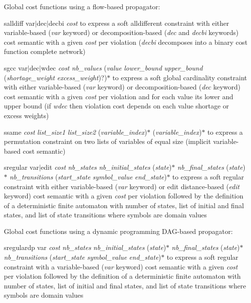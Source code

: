 \documentclass{article}
\begin{document}
\begin{DoxyItemize}
\begin{DoxyItemize}
\end{DoxyItemize}
\item Global cost functions using a flow-\/based propagator\-:
\begin{DoxyItemize}
\item salldiff var$\vert$dec$\vert$decbi {\itshape cost} to express a soft alldifferent constraint with either variable-\/based ({\itshape var} keyword) or decomposition-\/based ({\itshape dec} and {\itshape decbi} keywords) cost semantic with a given {\itshape cost} per violation ({\itshape decbi} decomposes into a binary cost function complete network)
\item sgcc var$\vert$dec$\vert$wdec {\itshape cost} {\itshape nb\-\_\-values} ({\itshape value} {\itshape lower\-\_\-bound} {\itshape upper\-\_\-bound} ({\itshape shortage\-\_\-weight} {\itshape excess\-\_\-weight})?)$\ast$ to express a soft global cardinality constraint with either variable-\/based ({\itshape var} keyword) or decomposition-\/based ({\itshape dec} keyword) cost semantic with a given {\itshape cost} per violation and for each value its lower and upper bound (if {\itshape wdec} then violation cost depends on each value shortage or excess weights)
\item ssame {\itshape cost} {\itshape list\-\_\-size1} {\itshape list\-\_\-size2} ({\itshape variable\-\_\-index})$\ast$ ({\itshape variable\-\_\-index})$\ast$ to express a permutation constraint on two lists of variables of equal size (implicit variable-\/based cost semantic)
\item sregular var$\vert$edit {\itshape cost} {\itshape nb\-\_\-states} {\itshape nb\-\_\-initial\-\_\-states} ({\itshape state})$\ast$ {\itshape nb\-\_\-final\-\_\-states} ({\itshape state})$\ast$ {\itshape nb\-\_\-transitions} ({\itshape start\-\_\-state} {\itshape symbol\-\_\-value} {\itshape end\-\_\-state})$\ast$ to express a soft regular constraint with either variable-\/based ({\itshape var} keyword) or edit distance-\/based ({\itshape edit} keyword) cost semantic with a given {\itshape cost} per violation followed by the definition of a deterministic finite automaton with number of states, list of initial and final states, and list of state transitions where symbols are domain values
\end{DoxyItemize}
\item Global cost functions using a dynamic programming D\-A\-G-\/based propagator\-:
\begin{DoxyItemize}
\item sregulardp var {\itshape cost} {\itshape nb\-\_\-states} {\itshape nb\-\_\-initial\-\_\-states} ({\itshape state})$\ast$ {\itshape nb\-\_\-final\-\_\-states} ({\itshape state})$\ast$ {\itshape nb\-\_\-transitions} ({\itshape start\-\_\-state} {\itshape symbol\-\_\-value} {\itshape end\-\_\-state})$\ast$ to express a soft regular constraint with a variable-\/based ({\itshape var} keyword) cost semantic with a given {\itshape cost} per violation followed by the definition of a deterministic finite automaton with number of states, list of initial and final states, and list of state transitions where symbols are domain values

\end{DoxyItemize}
\end{DoxyItemize}
\end{document}
